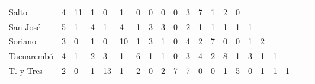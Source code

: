 \begin{table}
\begin{tabular}{lp{0.4cm}p{0.4cm}p{0.4cm}p{0.4cm}p{0.4cm}p{0.4cm}p{0.4cm}p{0.4cm}p{0.4cm}p{0.4cm}p{0.4cm}p{0.4cm}p{0.4cm}p{0.4cm}p{0.4cm}p{0.4cm}p{0.4cm}p{0.4cm}p{0.4cm}p{0.4cm}}
Salto        &   4 & 11 &  1 &  0 &  1 &  0 &  0 &  0 &  0 &   3 &   7 &   1 &   2 &   0 &     &     &     &     \\
San José     &   5 &  1 &  4 &  1 &  4 &  1 &  3 &  3 &  0 &   2 &   1 &   1 &   1 &   1 &   1 &     &     &     \\
Soriano      &   3 &  0 &  1 &  0 & 10 &  1 &  3 &  1 &  0 &   4 &   2 &   7 &   0 &   0 &   1 &   2 &     &     \\
Tacuarembó   &   4 &  1 &  2 &  3 &  1 &  6 &  1 &  1 &  0 &   3 &   4 &   2 &   8 &   1 &   3 &   1 &   1 &     \\
T. y Tres    &   2 &  0 &  1 & 13 &  1 &  2 &  0 &  2 &  7 &   7 &   0 &   0 &   1 &   5 &   0 &   1 &   1 &   1 \\
\bottomrule
\end{tabular}
\end{table}
